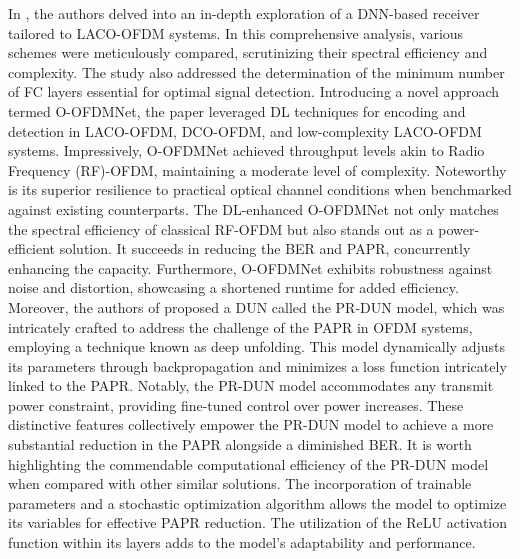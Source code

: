 \documentclass[conference]{IEEEtran}
\begin{document}
In \cite{b151}, the authors delved into an in-depth exploration of a DNN-based receiver tailored to LACO-OFDM systems. In this comprehensive analysis, various schemes were meticulously compared, scrutinizing their spectral efficiency and complexity. The study also addressed the determination of the minimum number of FC layers essential for optimal signal detection. Introducing a novel approach termed O-OFDMNet, the paper leveraged DL techniques for encoding and detection in LACO-OFDM, DCO-OFDM, and low-complexity LACO-OFDM systems. Impressively, O-OFDMNet achieved throughput levels akin to Radio Frequency (RF)-OFDM, maintaining a moderate level of complexity. Noteworthy is its superior resilience to practical optical channel conditions when benchmarked against existing counterparts. The DL-enhanced O-OFDMNet not only matches the spectral efficiency of classical RF-OFDM but also stands out as a power-efficient solution. It succeeds in reducing the BER and PAPR, concurrently enhancing the capacity. Furthermore, O-OFDMNet exhibits robustness against noise and distortion, showcasing a shortened runtime for added efficiency. Moreover, the authors of \cite{b152} proposed a DUN called the PR-DUN model, which was intricately crafted to address the challenge of the PAPR in OFDM systems, employing a technique known as deep unfolding. This model dynamically adjusts its parameters through backpropagation and minimizes a loss function intricately linked to the PAPR. Notably, the PR-DUN model accommodates any transmit power constraint, providing fine-tuned control over power increases. These distinctive features collectively empower the PR-DUN model to achieve a more substantial reduction in the PAPR alongside a diminished BER. It is worth highlighting the commendable computational efficiency of the PR-DUN model when compared with other similar solutions. The incorporation of trainable parameters and a stochastic optimization algorithm allows the model to optimize its variables for effective PAPR reduction. The utilization of the ReLU activation function within its layers adds to the model's adaptability and performance.
\end{document}
